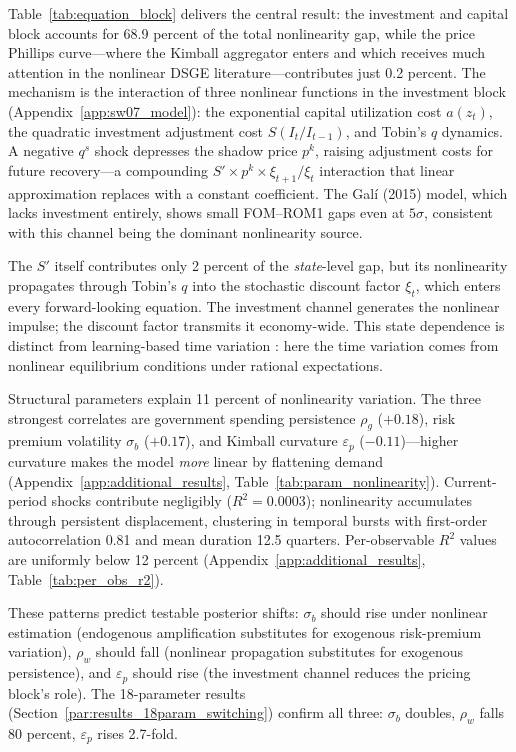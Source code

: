 \documentclass[12pt]{article}
\theoremstyle{plain}
\theoremstyle{definition}
\theoremstyle{remark}
\begin{document}
Table~\ref{tab:equation_block} delivers the central result: the investment and capital block accounts for 68.9 percent of the total nonlinearity gap, while the price Phillips curve---where the Kimball aggregator enters and which receives much attention in the nonlinear DSGE literature---contributes just 0.2 percent. The mechanism is the interaction of three nonlinear functions in the investment block (Appendix~\ref{app:sw07_model}): the exponential capital utilization cost $a(z_t)$, the quadratic investment adjustment cost $S(I_t/I_{t-1})$, and Tobin's $q$ dynamics. A negative $q^s$ shock depresses the shadow price $p^k$, raising adjustment costs for future recovery---a compounding $S' \times p^k \times \xi_{t+1}/\xi_t$ interaction that linear approximation replaces with a constant coefficient. The Gal\'i (2015) model, which lacks investment entirely, shows small FOM--ROM1 gaps even at $5\sigma$, consistent with this channel being the dominant nonlinearity source.

The $S'$ itself contributes only 2 percent of the \textit{state}-level gap, but its nonlinearity propagates through Tobin's $q$ into the stochastic discount factor $\xi_t$, which enters every forward-looking equation. The investment channel generates the nonlinear impulse; the discount factor transmits it economy-wide. This state dependence is distinct from learning-based time variation \citep{slobodyan2012learning}: here the time variation comes from nonlinear equilibrium conditions under rational expectations.

Structural parameters explain 11 percent of nonlinearity variation. The three strongest correlates are government spending persistence $\rho_g$ ($+0.18$), risk premium volatility $\sigma_b$ ($+0.17$), and Kimball curvature $\varepsilon_p$ ($-0.11$)---higher curvature makes the model \emph{more} linear by flattening demand (Appendix~\ref{app:additional_results}, Table~\ref{tab:param_nonlinearity}). Current-period shocks contribute negligibly ($R^2 = 0.0003$); nonlinearity accumulates through persistent displacement, clustering in temporal bursts with first-order autocorrelation 0.81 and mean duration 12.5 quarters. Per-observable $R^2$ values are uniformly below 12 percent (Appendix~\ref{app:additional_results}, Table~\ref{tab:per_obs_r2}).

These patterns predict testable posterior shifts: $\sigma_b$ should rise under nonlinear estimation (endogenous amplification substitutes for exogenous risk-premium variation), $\rho_w$ should fall (nonlinear propagation substitutes for exogenous persistence), and $\varepsilon_p$ should rise (the investment channel reduces the pricing block's role). The 18-parameter results (Section~\ref{par:results_18param_switching}) confirm all three: $\sigma_b$ doubles, $\rho_w$ falls 80 percent, $\varepsilon_p$ rises 2.7-fold.
\end{document}
